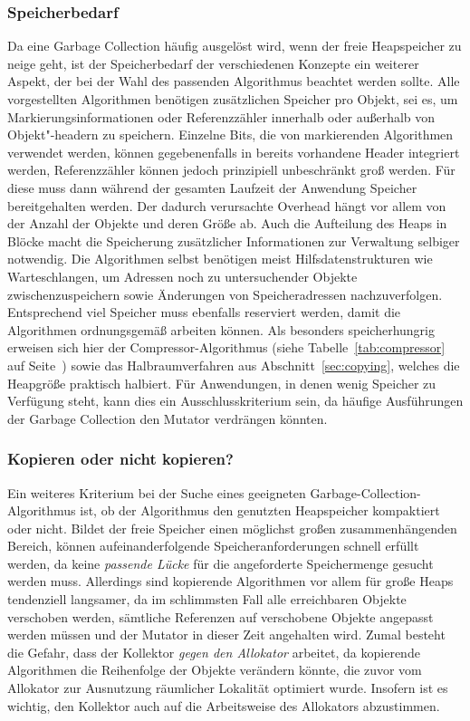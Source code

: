 

\subsubsection*{Speicherbedarf}
Da eine Garbage Collection häufig ausgelöst wird, wenn der freie Heapspeicher zu neige geht, ist der Speicherbedarf der verschiedenen Konzepte ein weiterer Aspekt, der bei der Wahl des passenden Algorithmus beachtet werden sollte.
Alle vorgestellten Algorithmen benötigen zusätzlichen Speicher pro Objekt, sei es, um Markierungsinformationen oder Referenzzähler innerhalb oder außerhalb von Objekt"-headern zu speichern.
Einzelne Bits, die von markierenden Algorithmen verwendet werden, können gegebenenfalls in bereits vorhandene Header integriert werden, Referenzzähler können jedoch prinzipiell unbeschränkt groß werden.
Für diese muss dann während der gesamten Laufzeit der Anwendung Speicher bereitgehalten werden.
Der dadurch verursachte Overhead hängt vor allem von der Anzahl der Objekte und deren Größe ab.
Auch die Aufteilung des Heaps in Blöcke macht die Speicherung zusätzlicher Informationen zur Verwaltung selbiger notwendig.
Die Algorithmen selbst benötigen meist Hilfsdatenstrukturen wie Warteschlangen, um Adressen noch zu untersuchender Objekte zwischenzuspeichern sowie Änderungen von Speicheradressen nachzuverfolgen.
Entsprechend viel Speicher muss ebenfalls reserviert werden, damit die Algorithmen ordnungsgemäß arbeiten können.
Als besonders speicherhungrig erweisen sich hier der Compressor-Algorithmus (siehe Tabelle~\ref{tab:compressor} auf Seite~\pageref{tab:compressor}) sowie das Halbraumverfahren aus Abschnitt~\ref{sec:copying}, welches die Heapgröße praktisch halbiert.
Für Anwendungen, in denen wenig Speicher zu Verfügung steht, kann dies ein Ausschlusskriterium sein, da häufige Ausführungen der Garbage Collection den Mutator verdrängen könnten.




\subsubsection*{Kopieren oder nicht kopieren?}
Ein weiteres Kriterium bei der Suche eines geeigneten Garbage-Collection-Algorithmus ist, ob der Algorithmus den genutzten Heapspeicher kompaktiert oder nicht.
Bildet der freie Speicher einen möglichst großen zusammenhängenden Bereich, können aufeinanderfolgende Speicheranforderungen schnell erfüllt werden, da keine \textit{passende Lücke} für die angeforderte Speichermenge gesucht werden muss.
Allerdings sind kopierende Algorithmen vor allem für große Heaps tendenziell langsamer, da im schlimmsten Fall alle erreichbaren Objekte verschoben werden, sämtliche Referenzen auf verschobene Objekte angepasst werden müssen und der Mutator in dieser Zeit angehalten wird.
Zumal besteht die Gefahr, dass der Kollektor \textit{gegen den Allokator} arbeitet, da kopierende Algorithmen die Reihenfolge der Objekte verändern könnte, die zuvor vom Allokator zur Ausnutzung räumlicher Lokalität optimiert wurde.
Insofern ist es wichtig, den Kollektor auch auf die Arbeitsweise des Allokators abzustimmen.


